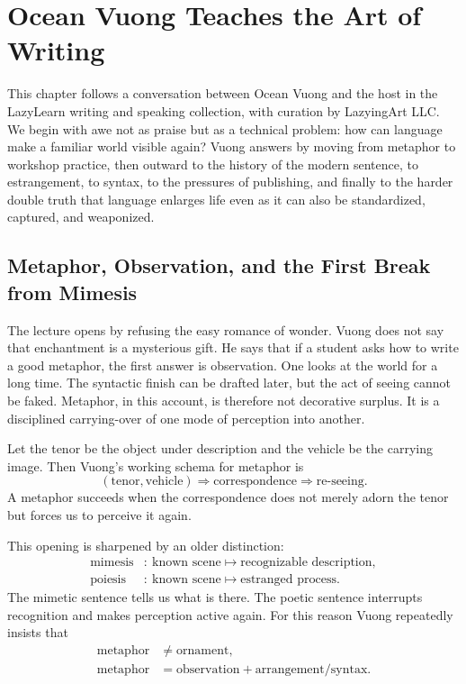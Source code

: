 \chapter{Ocean Vuong Teaches the Art of Writing}

This chapter follows a conversation between Ocean Vuong and the host in the LazyLearn writing and speaking collection, with curation by LazyingArt LLC. We begin with awe not as praise but as a technical problem: how can language make a familiar world visible again? Vuong answers by moving from metaphor to workshop practice, then outward to the history of the modern sentence, to estrangement, to syntax, to the pressures of publishing, and finally to the harder double truth that language enlarges life even as it can also be standardized, captured, and weaponized.

\section{Metaphor, Observation, and the First Break from Mimesis}

The lecture opens by refusing the easy romance of wonder. Vuong does not say that enchantment is a mysterious gift. He says that if a student asks how to write a good metaphor, the first answer is observation. One looks at the world for a long time. The syntactic finish can be drafted later, but the act of seeing cannot be faked. Metaphor, in this account, is therefore not decorative surplus. It is a disciplined carrying-over of one mode of perception into another.

\begin{definition}
Let the tenor be the object under description and the vehicle be the carrying image. Then Vuong's working schema for metaphor is
\begin{equation}
(\text{tenor},\text{vehicle}) \Longrightarrow \text{correspondence} \Longrightarrow \text{re-seeing}.
\end{equation}
A metaphor succeeds when the correspondence does not merely adorn the tenor but forces us to perceive it again.
\end{definition}

This opening is sharpened by an older distinction:
\begin{align}
\text{mimesis} &:\ \text{known scene} \mapsto \text{recognizable description},\\
\text{poiesis} &:\ \text{known scene} \mapsto \text{estranged process}.
\end{align}
The mimetic sentence tells us what is there. The poetic sentence interrupts recognition and makes perception active again. For this reason Vuong repeatedly insists that
\begin{align}
\text{metaphor} &\neq \text{ornament},\\
\text{metaphor} &= \text{observation} + \text{arrangement/syntax}.
\end{align}

